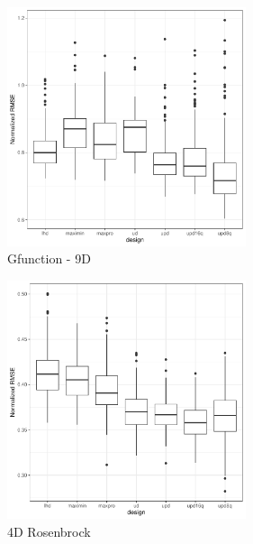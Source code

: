 \documentclass{beamer}
\begin{document}
\begin{frame}
\begin{figure}
\centering
\caption{Gfunction - 9D}
\includegraphics[height=7cm]{../chapters/EGO/pdfs/Gfunction_64x15}
\end{figure}
\end{frame}



\begin{frame}
\begin{figure}
\centering
\caption{4D Rosenbrock}
\includegraphics[height=7cm]{../chapters/EGO/pdfs/Rosenbrock4d_64x15}
\end{figure}
\end{frame}
\end{document}
